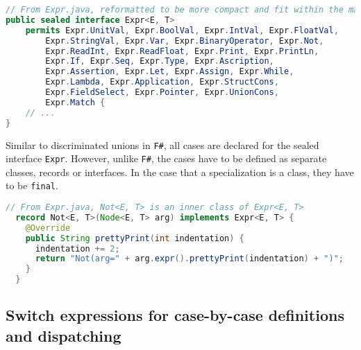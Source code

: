 \begin{lstlisting}[language=Java]
// From Expr.java, reformatted to be more compact and fit within the margins
public sealed interface Expr<E, T>
    permits Expr.UnitVal, Expr.BoolVal, Expr.IntVal, Expr.FloatVal,
        Expr.StringVal, Expr.Var, Expr.BinaryOperator, Expr.Not,
        Expr.ReadInt, Expr.ReadFloat, Expr.Print, Expr.PrintLn,
        Expr.If, Expr.Seq, Expr.Type, Expr.Ascription,
        Expr.Assertion, Expr.Let, Expr.Assign, Expr.While,
        Expr.Lambda, Expr.Application, Expr.StructCons,
        Expr.FieldSelect, Expr.Pointer, Expr.UnionCons,
        Expr.Match {
    // ...
}
\end{lstlisting}

Similar to discriminated unions in \texttt{F\#}, all cases are declared for the sealed interface \texttt{Expr}. However, unlike \texttt{F\#},
the cases have to be defined as separate classes, records or interfaces. In the case that a specialization is a class, they have to be \texttt{final}.

\begin{lstlisting}[language=Java]
  // From Expr.java, Not<E, T> is an inner class of Expr<E, T>
  record Not<E, T>(Node<E, T> arg) implements Expr<E, T> {
    @Override
    public String prettyPrint(int indentation) {
      indentation += 2;
      return "Not(arg=" + arg.expr().prettyPrint(indentation) + ")";
    }
  }
\end{lstlisting}

\subsection{Switch expressions for case-by-case definitions and dispatching}

